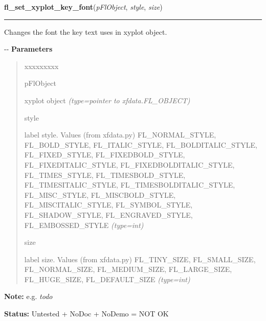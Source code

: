     \label{xformslib:flxyplot:fl_set_xyplot_key_font}

    \vspace{0.5ex}

\hspace{.8\funcindent}\begin{boxedminipage}{\funcwidth}

    \raggedright \textbf{fl\_set\_xyplot\_key\_font}(\textit{pFlObject}, \textit{style}, \textit{size})

    \vspace{-1.5ex}

    \rule{\textwidth}{0.5\fboxrule}
\setlength{\parskip}{2ex}

Changes the font the key text uses in xyplot object.

-{}-
\setlength{\parskip}{1ex}
      \textbf{Parameters}
      \vspace{-1ex}

      \begin{quote}
        \begin{Ventry}{xxxxxxxxx}

          \item[pFlObject]


xyplot object
            {\it (type=pointer to xfdata.FL\_OBJECT)}

          \item[style]


label style. Values (from xfdata.py) FL\_NORMAL\_STYLE,
FL\_BOLD\_STYLE, FL\_ITALIC\_STYLE, FL\_BOLDITALIC\_STYLE, FL\_FIXED\_STYLE,
FL\_FIXEDBOLD\_STYLE, FL\_FIXEDITALIC\_STYLE, FL\_FIXEDBOLDITALIC\_STYLE,
FL\_TIMES\_STYLE, FL\_TIMESBOLD\_STYLE, FL\_TIMESITALIC\_STYLE,
FL\_TIMESBOLDITALIC\_STYLE, FL\_MISC\_STYLE, FL\_MISCBOLD\_STYLE,
FL\_MISCITALIC\_STYLE, FL\_SYMBOL\_STYLE, FL\_SHADOW\_STYLE,
FL\_ENGRAVED\_STYLE, FL\_EMBOSSED\_STYLE
            {\it (type=int)}

          \item[size]


label size. Values (from xfdata.py) FL\_TINY\_SIZE, FL\_SMALL\_SIZE,
FL\_NORMAL\_SIZE, FL\_MEDIUM\_SIZE, FL\_LARGE\_SIZE, FL\_HUGE\_SIZE,
FL\_DEFAULT\_SIZE
            {\it (type=int)}

        \end{Ventry}

      \end{quote}

\textbf{Note:} 
e.g. \emph{todo}


\textbf{Status:} 
Untested + NoDoc + NoDemo = NOT OK


    \end{boxedminipage}

